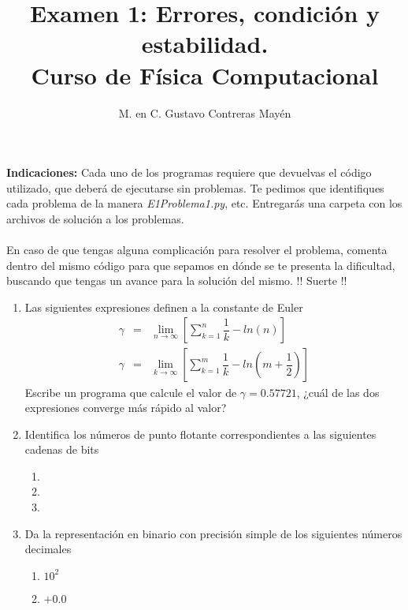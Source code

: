 \documentclass[11pt]{article}
\title{Examen 1: Errores, condición y estabilidad. \\ Curso de Física Computacional}
\author{M. en C. Gustavo Contreras Mayén}
\date{ }
\begin{document}
\maketitle
\fontsize{14}{14}\selectfont
\textbf{Indicaciones: } Cada uno de los programas requiere que devuelvas el código utilizado, que deberá de ejecutarse sin problemas. Te pedimos que identifiques cada problema de la manera \emph{E1Problema1.py}, etc. Entregarás una carpeta con los archivos de solución a los problemas.
\\
\\
En caso de que tengas alguna complicación para resolver el problema, comenta dentro del mismo código para que sepamos en dónde se te presenta la dificultad, buscando que tengas un avance para la solución del mismo. !! Suerte !!
\begin{enumerate}
\item Las siguientes expresiones definen a la constante de Euler
\begin{eqnarray}
\gamma &=& \lim_{n \rightarrow \infty} \left[ \sum_{k=1}^{n} \dfrac{1}{k} - ln (n) \right] \\
\gamma &=& \lim_{k \rightarrow \infty} \left[ \sum_{k=1}^{m} \dfrac{1}{k} - ln \left( m + \dfrac{1}{2} \right) \right]
\end{eqnarray}
Escribe un programa que calcule el valor de $\gamma = 0.57721$, ¿cu\'{a}l de las dos expresiones converge m\'{a}s r\'{a}pido al valor?
\item Identifica los números de punto flotante correspondientes a las siguientes cadenas de bits
\begin{enumerate}
\item {}
\item {}
\item {}
\end{enumerate}
\item Da la representación en binario con precisión simple de los siguientes números decimales
\begin{enumerate}
\item $10^{2}$
\item $+0.0$

\end{enumerate}
\end{enumerate}
\end{document}
